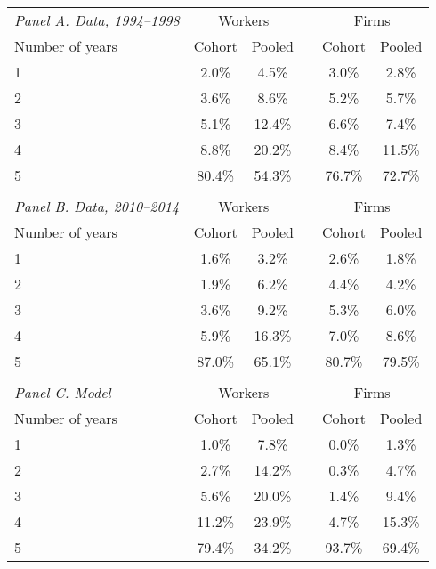 \begin{tabular}{lccccc}
   &  &  &  &  & \tabularnewline
  \hline
  \hline
  \emph{Panel A. Data, 1994--1998} & \multicolumn{2}{c}{Workers} &  & \multicolumn{2}{c}{Firms}\tabularnewline
  \cline{2-3} \cline{3-3} \cline{5-6} \cline{6-6}
  Number of years & Cohort & Pooled &  & Cohort & Pooled\tabularnewline
  \hline
  1 & 2.0\% & 4.5\% &  & 3.0\% & 2.8\%\tabularnewline
  2 & 3.6\% & 8.6\% &  & 5.2\% & 5.7\%\tabularnewline
  3 & 5.1\% & 12.4\% &  & 6.6\% & 7.4\%\tabularnewline
  4 & 8.8\% & 20.2\% &  & 8.4\% & 11.5\%\tabularnewline
  5 & 80.4\% & 54.3\% &  & 76.7\% & 72.7\%\tabularnewline
   &  &  &  &  & \tabularnewline
  \emph{Panel B. Data, 2010--2014} & \multicolumn{2}{c}{Workers} &  & \multicolumn{2}{c}{Firms}\tabularnewline
  \cline{2-3} \cline{3-3} \cline{5-6} \cline{6-6}
  Number of years & Cohort & Pooled &  & Cohort & Pooled\tabularnewline
  \hline
  1 & 1.6\% & 3.2\% &  & 2.6\% & 1.8\%\tabularnewline
  2 & 1.9\% & 6.2\% &  & 4.4\% & 4.2\%\tabularnewline
  3 & 3.6\% & 9.2\% &  & 5.3\% & 6.0\%\tabularnewline
  4 & 5.9\% & 16.3\% &  & 7.0\% & 8.6\%\tabularnewline
  5 & 87.0\% & 65.1\% &  & 80.7\% & 79.5\%\tabularnewline
   &  &  &  &  & \tabularnewline
  \emph{Panel C. Model} & \multicolumn{2}{c}{Workers} &  & \multicolumn{2}{c}{Firms}\tabularnewline
  \cline{2-3} \cline{3-3} \cline{5-6} \cline{6-6}
  Number of years & Cohort & Pooled &  & Cohort & Pooled\tabularnewline
  \hline
  1 & 1.0\% & 7.8\% &  & 0.0\% & 1.3\%\tabularnewline
  2 & 2.7\% & 14.2\% &  & 0.3\% & 4.7\%\tabularnewline
  3 & 5.6\% & 20.0\% &  & 1.4\% & 9.4\%\tabularnewline
  4 & 11.2\% & 23.9\% &  & 4.7\% & 15.3\%\tabularnewline
  5 & 79.4\% & 34.2\% &  & 93.7\% & 69.4\%\tabularnewline
  \hline
\end{tabular}
